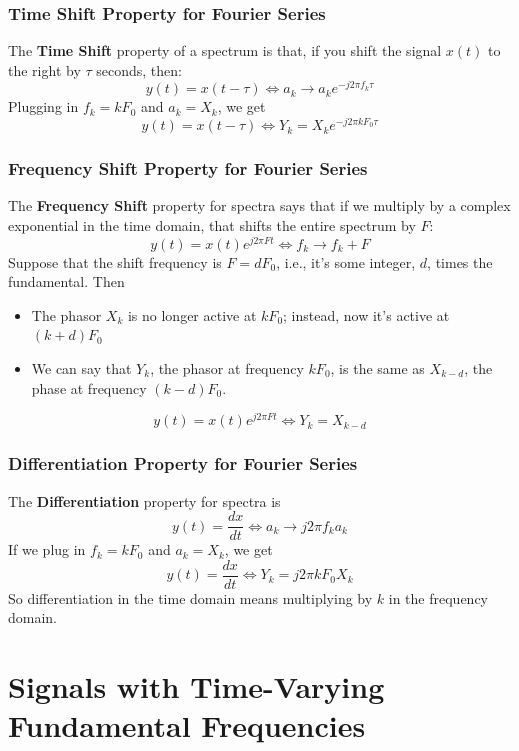 \documentclass{beamer}
\begin{document}
\begin{frame}
  \frametitle{Time Shift Property for Fourier Series}

  The {\bf Time Shift} property of a spectrum is that, if you shift
  the signal $x(t)$ to the right by $\tau$ seconds, then:
  \[
  y(t)=x(t-\tau)\Leftrightarrow a_k\rightarrow a_k e^{-j2\pi f_k\tau}
  \]
  Plugging in $f_k=kF_0$ and $a_k=X_k$, we get
  \[
  y(t)=x(t-\tau)\Leftrightarrow Y_k= X_k e^{-j2\pi kF_0\tau}
  \]
\end{frame}

\begin{frame}
  \frametitle{Frequency Shift Property for Fourier Series}

  The {\bf Frequency Shift} property for spectra says that if we
  multiply by a complex exponential in the time domain, that shifts
  the entire spectrum by $F$:
  \[
  y(t)=x(t)e^{j2\pi Ft} \Leftrightarrow f_k\rightarrow f_k+F
  \]
  Suppose that the shift frequency is $F=dF_0$, i.e., it's
  some integer, $d$, times the fundamental.
  Then
  \begin{itemize}
  \item The phasor $X_k$ is no longer active at $kF_0$;
    instead, now it's active at $(k+d)F_0$
  \item We can say that $Y_k$, the phasor at frequency $kF_0$, is
    the same as $X_{k-d}$, the phase at frequency $(k-d)F_0$.
  \end{itemize}
  \[
  y(t)=x(t)e^{j2\pi Ft} \Leftrightarrow Y_{k} = X_{k-d}
  \]
\end{frame}
\begin{frame}
  \frametitle{Differentiation Property for Fourier Series}
  The {\bf Differentiation} property for spectra is
  \[
  y(t) = \frac{dx}{dt} \Leftrightarrow a_k\rightarrow j2\pi f_k a_k
  \]
  If we plug in $f_k=kF_0$ and $a_k=X_k$, we get
  \[
  y(t) = \frac{dx}{dt} \Leftrightarrow Y_k= j2\pi kF_0 X_k
  \]
  So differentiation in the time domain means multiplying by $k$ in
  the frequency domain.
\end{frame}  

\section[Time-Varying]{Signals with Time-Varying Fundamental Frequencies}
\setcounter{subsection}{1}
\end{document}
